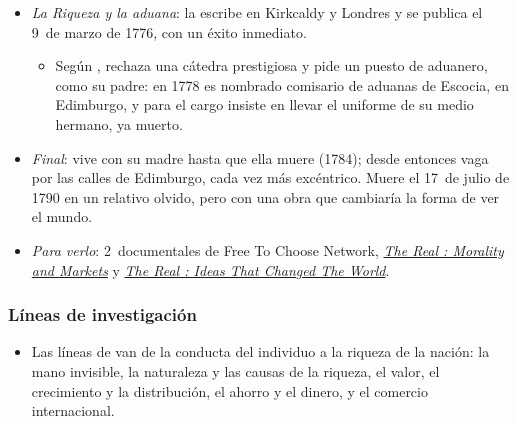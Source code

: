 \documentclass[11pt]{article}
\begin{document}
\begin{anotaciones}
\begin{itemize}
\begin{itemize}
  \item en Ginebra conoce a ;
  \item en París trata a los fisiócratas (, ), se reencuentra con  y conoce, según , a ,  y ;
  \item la muerte de , hermano menor del duque, en 1766, obliga a volver de repente.
  \end{itemize}
\item \emph{La \emph{Riqueza} y la aduana}: la escribe en Kirkcaldy y Londres y se publica el 9~de marzo de 1776, con un éxito inmediato.
  \begin{itemize}
  \item Según , rechaza una cátedra prestigiosa y pide un puesto de aduanero, como su padre: en 1778 es nombrado comisario de aduanas de Escocia, en Edimburgo, y para el cargo insiste en llevar el uniforme de su medio hermano, ya muerto.
  \end{itemize}
\item \emph{Final}: vive con su madre hasta que ella muere (1784); desde entonces vaga por las calles de Edimburgo, cada vez más excéntrico. Muere el 17~de julio de 1790 en un relativo olvido, pero con una obra que cambiaría la forma de ver el mundo.
\item \emph{Para verlo}: 2~documentales de Free To Choose Network, \href{https://www.youtube.com/watch?v=V6S6pMsKzlI}{\emph{The Real : Morality and Markets}} y \href{https://www.youtube.com/watch?v=8ruiUOQERnw}{\emph{The Real : Ideas That Changed The World}}.
\end{itemize}
\end{anotaciones}

\subsubsection{Líneas de investigación}\label{sec:smith-lineas}

\begin{itemize}
\item Las líneas de  van de la conducta del individuo a la riqueza de la nación: la mano invisible, la naturaleza y las causas de la riqueza, el valor, el crecimiento y la distribución, el ahorro y el dinero, y el comercio internacional.
\end{itemize}
\end{document}
